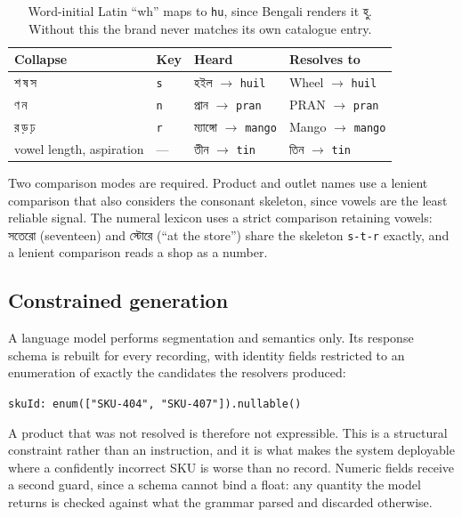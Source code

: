 \documentclass[11pt,a4paper]{article}
\newcommand{\bng}[1]{{\bn #1}}
\newcommand{\code}[1]{\texttt{\small #1}}
\begin{document}
\begin{table}[h]
\centering\small
\begin{tabular}{@{}l l | l l@{}}
\toprule
\textbf{Collapse} & \textbf{Key} & \textbf{Heard} & \textbf{Resolves to} \\
\midrule
\bng{শ}\,\bng{ষ}\,\bng{স} & \code{s} & \bng{হইল} $\rightarrow$ \code{huil} & Wheel $\rightarrow$ \code{huil} \\
\bng{ণ}\,\bng{ন} & \code{n} & \bng{প্রান} $\rightarrow$ \code{pran} & PRAN $\rightarrow$ \code{pran} \\
\bng{র}\,\bng{ড়}\,\bng{ঢ়} & \code{r} & \bng{ম্যাঙ্গো} $\rightarrow$ \code{mango} & Mango $\rightarrow$ \code{mango} \\
vowel length, aspiration & --- & \bng{তীন} $\rightarrow$ \code{tin} & \bng{তিন} $\rightarrow$ \code{tin} \\
\bottomrule
\end{tabular}
\caption{Word-initial Latin ``wh'' maps to \code{hu}, since Bengali renders it \bng{হু}. Without this the brand never matches its own catalogue entry.}
\end{table}

Two comparison modes are required. Product and outlet names use a lenient
comparison that also considers the consonant skeleton, since vowels are the
least reliable signal. The numeral lexicon uses a strict comparison retaining
vowels: \bng{সতেরো} (seventeen) and \bng{স্টোরে} (``at the store'') share the
skeleton \code{s-t-r} exactly, and a lenient comparison reads a shop as a
number.

\subsection{Constrained generation}

A language model performs segmentation and semantics only. Its response schema
is rebuilt for every recording, with identity fields restricted to an
enumeration of exactly the candidates the resolvers produced:

\begin{center}\small
\code{skuId: enum(["SKU-404", "SKU-407"]).nullable()}
\end{center}

A product that was not resolved is therefore not expressible. This is a
structural constraint rather than an instruction, and it is what makes the
system deployable where a confidently incorrect SKU is worse than no record.
Numeric fields receive a second guard, since a schema cannot bind a float:
any quantity the model returns is checked against what the grammar parsed and
discarded otherwise.
\end{document}
